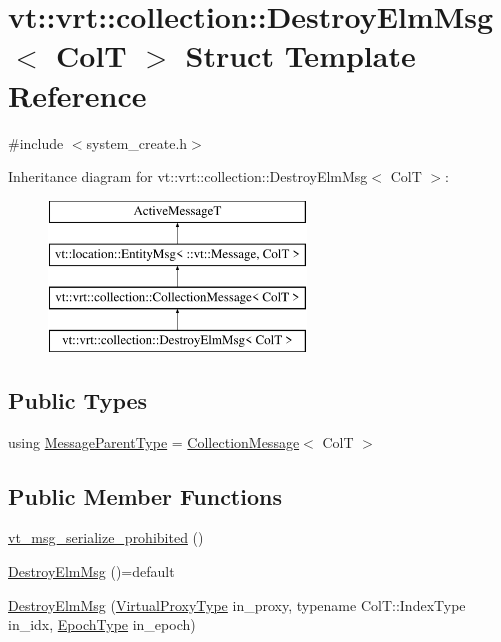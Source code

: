 \hypertarget{structvt_1_1vrt_1_1collection_1_1_destroy_elm_msg}{}\section{vt\+:\+:vrt\+:\+:collection\+:\+:Destroy\+Elm\+Msg$<$ ColT $>$ Struct Template Reference}
\label{structvt_1_1vrt_1_1collection_1_1_destroy_elm_msg}


{\ttfamily \#include $<$system\+\_\+create.\+h$>$}

Inheritance diagram for vt\+:\+:vrt\+:\+:collection\+:\+:Destroy\+Elm\+Msg$<$ ColT $>$\+:\begin{figure}[H]
\begin{center}
\leavevmode
\includegraphics[height=4.000000cm]{structvt_1_1vrt_1_1collection_1_1_destroy_elm_msg}
\end{center}
\end{figure}
\subsection*{Public Types}
\begin{DoxyCompactItemize}
\item 
using \hyperlink{structvt_1_1vrt_1_1collection_1_1_destroy_elm_msg_a4e24b2bce083d36d6fb448e37f40833b}{Message\+Parent\+Type} = \hyperlink{structvt_1_1vrt_1_1collection_1_1_collection_message}{Collection\+Message}$<$ ColT $>$
\end{DoxyCompactItemize}
\subsection*{Public Member Functions}
\begin{DoxyCompactItemize}
\item 
\hyperlink{structvt_1_1vrt_1_1collection_1_1_destroy_elm_msg_ae016922c6fe3c19d38d6e164e8660f65}{vt\+\_\+msg\+\_\+serialize\+\_\+prohibited} ()
\item 
\hyperlink{structvt_1_1vrt_1_1collection_1_1_destroy_elm_msg_a2bf33cf7e0b6327724ecab2ac97774b4}{Destroy\+Elm\+Msg} ()=default
\item 
\hyperlink{structvt_1_1vrt_1_1collection_1_1_destroy_elm_msg_a837873a189d4267f599ec975d2cde6f2}{Destroy\+Elm\+Msg} (\hyperlink{namespacevt_a1b417dd5d684f045bb58a0ede70045ac}{Virtual\+Proxy\+Type} in\+\_\+proxy, typename Col\+T\+::\+Index\+Type in\+\_\+idx, \hyperlink{namespacevt_a985a5adf291c34a3ca263b3378388236}{Epoch\+Type} in\+\_\+epoch)
\end{DoxyCompactItemize}
